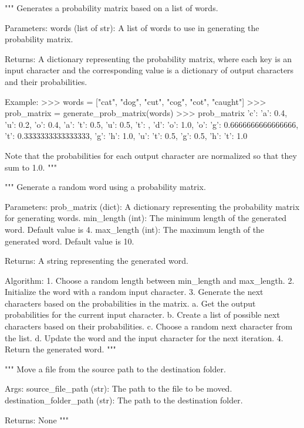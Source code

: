 \begin{codebox}
"""
Generates a probability matrix based on a list of words.

Parameters:
    words (list of str): A list of words to use in generating the probability matrix.

Returns:
    A dictionary representing the probability matrix, where each key is an input character
    and the corresponding value is a dictionary of output characters and their probabilities.

Example:
    >>> words = ["cat", "dog", "cut", "cog", "cot", "caught"]
    >>> prob_matrix = generate_prob_matrix(words)
    >>> prob_matrix
{
    'c': {'a': 0.4, 'u': 0.2, 'o': 0.4},
    'a': {'t': 0.5, 'u': 0.5},
    't': {},
    'd': {'o': 1.0},
    'o': {'g': 0.6666666666666666, 't': 0.3333333333333333},
    'g': {'h': 1.0},
    'u': {'t': 0.5, 'g': 0.5},
    'h': {'t': 1.0}
}

Note that the probabilities for each output character are normalized so that they sum to 1.0.
"""
\end{codebox}

\begin{codebox}[generate\_word(prob\_matrix, min\_length=4, max\_length=10)]
"""
Generate a random word using a probability matrix.

Parameters:
    prob_matrix (dict): A dictionary representing the probability matrix for generating words.
    min_length (int): The minimum length of the generated word. Default value is 4.
    max_length (int): The maximum length of the generated word. Default value is 10.

Returns:
    A string representing the generated word.

Algorithm:
    1. Choose a random length between min_length and max_length.
    2. Initialize the word with a random input character.
    3. Generate the next characters based on the probabilities in the matrix.
        a. Get the output probabilities for the current input character.
        b. Create a list of possible next characters based on their probabilities.
        c. Choose a random next character from the list.
        d. Update the word and the input character for the next iteration.
    4. Return the generated word.
"""
\end{codebox}

\begin{codebox}
"""
Move a file from the source path to the destination folder.

Args:
    source_file_path (str): The path to the file to be moved.
    destination_folder_path (str): The path to the destination folder.

Returns:
    None
"""
\end{codebox}

